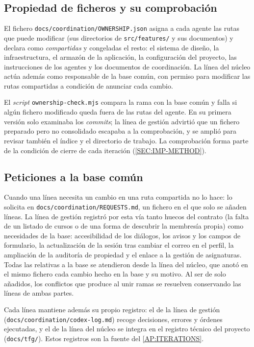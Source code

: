 \subsection{Propiedad de ficheros y su comprobación}

El fichero \texttt{docs/coordination/OWNERSHIP.json} asigna a cada agente las rutas que
puede modificar (sus directorios de \texttt{src/features/} y sus documentos) y declara como
\emph{compartidas} y congeladas el resto: el sistema de diseño, la infraestructura, el
armazón de la aplicación, la configuración del proyecto, las instrucciones de los agentes y
los documentos de coordinación. La línea del núcleo actúa además como responsable de la base
común, con permiso para modificar las rutas compartidas a condición de anunciar cada cambio.

El \textit{script} \texttt{ownership-check.mjs} compara la rama con la base común y falla si
algún fichero modificado queda fuera de las rutas del agente. En su primera versión solo
examinaba los \textit{commits}; la línea de gestión advirtió que un fichero preparado pero
no consolidado escapaba a la comprobación, y se amplió para revisar también el índice y el
directorio de trabajo. La comprobación forma parte de la condición de cierre de cada
iteración (\cref{SEC:IMP-METHOD}).

\subsection{Peticiones a la base común}

Cuando una línea necesita un cambio en una ruta compartida no lo hace: lo solicita en
\texttt{docs/coordination/REQUESTS.md}, un fichero en el que solo se añaden líneas. La línea
de gestión registró por esta vía tanto huecos del contrato (la falta de un listado de cursos
o de una forma de descubrir la membresía propia) como necesidades de la base: accesibilidad
de los diálogos, los avisos y los campos de formulario, la actualización de la sesión tras
cambiar el correo en el perfil, la ampliación de la auditoría de propiedad y el enlace a la
gestión de asignaturas. Todas las relativas a la base se atendieron desde la línea del
núcleo, que anotó en el mismo fichero cada cambio hecho en la base y su motivo. Al ser de solo
añadidos, los conflictos que produce al unir ramas se resuelven conservando las líneas de
ambas partes.

Cada línea mantiene además su propio registro: el de la línea de gestión
(\texttt{docs/coordination/codex-log.md}) recoge decisiones, errores y órdenes ejecutadas, y
el de la línea del núcleo se integra en el registro técnico del proyecto
(\texttt{docs/tfg/}). Estos registros son la fuente del \cref{AP:ITERATIONS}.

